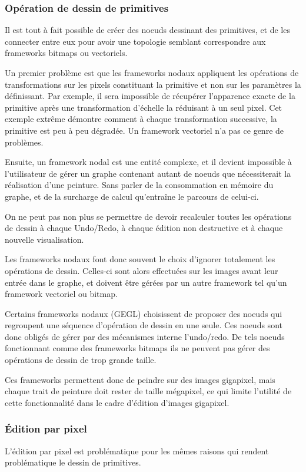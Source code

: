 			\subsubsection{Opération de dessin de primitives}
				Il est tout à fait possible de créer des noeuds dessinant des primitives, et de les connecter entre eux pour avoir une topologie
				semblant correspondre aux frameworks bitmaps ou vectoriels. 

				Un premier problème est que les frameworks nodaux appliquent les opérations de transformations sur les pixels constituant la primitive et non sur les paramètres la définissant.
				Par exemple, il sera impossible de récupérer l'apparence exacte de la primitive après une transformation d'échelle 
				la réduisant à un seul pixel. Cet exemple extrême démontre comment à chaque transformation successive, la primitive est peu à peu
				dégradée. Un framework vectoriel n'a pas ce genre de problèmes.
				
				Ensuite, un framework nodal est une entité complexe, et il devient impossible à l'utilisateur de gérer un graphe contenant 
				autant de noeuds que nécessiterait la réalisation d'une peinture. Sans parler de la consommation en mémoire du graphe, 
				et de la surcharge de calcul qu'entraîne le parcours de celui-ci.

				On ne peut pas non plus se permettre de devoir recalculer toutes les opérations de dessin à chaque Undo/Redo, à chaque édition
				non destructive et à chaque nouvelle visualisation.

				Les frameworks nodaux font donc souvent le choix d'ignorer totalement les opérations de dessin. Celles-ci sont alors effectuées
				sur les images avant leur entrée dans le graphe, et doivent être gérées par un autre framework tel qu'un framework vectoriel ou bitmap.

				Certains frameworks nodaux (GEGL) choisissent de proposer des noeuds qui regroupent une séquence d'opération de dessin en une seule.
				Ces noeuds sont donc obligés de gérer par des mécanismes interne l'undo/redo. De tels noeuds fonctionnant comme des frameworks bitmaps
				ils ne peuvent pas gérer des opérations de dessin de trop grande taille. 
				
				Ces frameworks permettent donc de peindre sur des images gigapixel, mais chaque trait de peinture doit rester de taille mégapixel,
				ce qui limite l'utilité de cette fonctionnalité dans le cadre d'édition d'images gigapixel.


			\subsubsection{Édition par pixel}
				L'édition par pixel est problématique pour les mêmes raisons qui rendent problématique le dessin de primitives.
